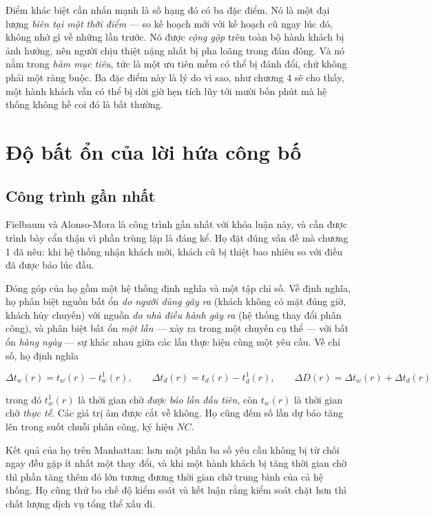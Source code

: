 Điểm khác biệt cần nhấn mạnh là số hạng đó có ba đặc điểm. Nó là một đại lượng \emph{biên tại
một thời điểm} --- so kế hoạch mới với kế hoạch cũ ngay lúc đó, không nhớ gì về những lần trước.
Nó được \emph{cộng gộp} trên toàn bộ hành khách bị ảnh hưởng, nên người chịu thiệt nặng nhất bị
pha loãng trong đám đông. Và nó nằm trong \emph{hàm mục tiêu}, tức là một ưu tiên mềm có thể bị
đánh đổi, chứ không phải một ràng buộc. Ba đặc điểm này là lý do vì sao, như chương 4 sẽ cho
thấy, một hành khách vẫn có thể bị dời giờ hẹn tích lũy tới mười bốn phút mà hệ thống không hề
coi đó là bất thường.

\section{Độ bất ổn của lời hứa công bố}

\subsection{Công trình gần nhất}

Fielbaum và Alonso-Mora \cite{fielbaum2020} là công trình gần nhất với khóa luận này, và cần
được trình bày cẩn thận vì phần trùng lặp là đáng kể. Họ đặt đúng vấn đề mà chương 1 đã nêu:
khi hệ thống nhận khách mới, khách cũ bị thiệt bao nhiêu so với điều đã được báo lúc đầu.

Đóng góp của họ gồm một hệ thống định nghĩa và một tập chỉ số. Về định nghĩa, họ phân biệt
nguồn bất ổn \emph{do người dùng gây ra} (khách không có mặt đúng giờ, khách hủy chuyến) với
nguồn \emph{do nhà điều hành gây ra} (hệ thống thay đổi phân công), và phân biệt bất ổn
\emph{một lần} --- xảy ra trong một chuyến cụ thể --- với bất ổn \emph{hàng ngày} --- sự khác
nhau giữa các lần thực hiện cùng một yêu cầu. Về chỉ số, họ định nghĩa

\begin{equation}
\Delta t_w(r) = t_w(r) - t^1_w(r), \qquad
\Delta t_d(r) = t_d(r) - t^1_d(r), \qquad
\Delta D(r) = \Delta t_w(r) + \Delta t_d(r)
\end{equation}

trong đó $t^1_w(r)$ là thời gian chờ \emph{được báo lần đầu tiên}, còn $t_w(r)$ là thời gian
chờ \emph{thực tế}. Các giá trị âm được cắt về không. Họ cũng đếm số lần dự báo tăng lên trong
suốt chuỗi phân công, ký hiệu $NC$.

Kết quả của họ trên Manhattan: hơn một phần ba số yêu cầu không bị từ chối ngay đều gặp ít nhất
một thay đổi, và khi một hành khách bị tăng thời gian chờ thì phần tăng thêm đó lớn tương đương
thời gian chờ trung bình của cả hệ thống. Họ cũng thử ba chế độ kiểm soát và kết luận rằng
kiểm soát chặt hơn thì chất lượng dịch vụ tổng thể xấu đi.

